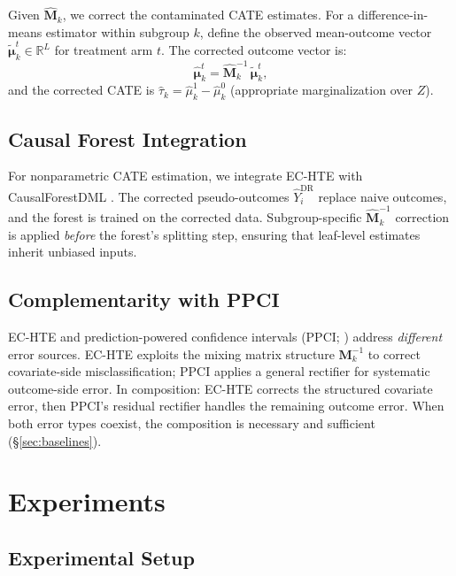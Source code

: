 \documentclass[11pt,twocolumn]{article}
\theoremstyle{remark}
\newcommand{\R}{\mathbb{R}}
\newcommand{\vect}[1]{\boldsymbol{#1}}
\begin{document}
Given $\hat{\vect{M}}_k$, we correct the contaminated CATE estimates.
For a difference-in-means estimator within subgroup $k$, define the observed mean-outcome vector $\tilde{\vect{\mu}}_k^t \in \R^L$ for treatment arm $t$.
The corrected outcome vector is:
\begin{equation}
\hat{\vect{\mu}}_k^t = \hat{\vect{M}}_k^{-1} \, \tilde{\vect{\mu}}_k^t,
\end{equation}
and the corrected CATE is $\hat{\tau}_k = \hat{\mu}_k^1 - \hat{\mu}_k^0$ (appropriate marginalization over $Z$).

\subsection{Causal Forest Integration}

For nonparametric CATE estimation, we integrate EC-HTE with CausalForestDML \cite{athey2019generalized, chernozhukov2018double}.
The corrected pseudo-outcomes $\hat{Y}_i^{\mathrm{DR}}$ replace naive outcomes, and the forest is trained on the corrected data.
Subgroup-specific $\hat{\vect{M}}_k^{-1}$ correction is applied \emph{before} the forest's splitting step, ensuring that leaf-level estimates inherit unbiased inputs.

\subsection{Complementarity with PPCI}\label{sec:ppci}

EC-HTE and prediction-powered confidence intervals (PPCI; \cite{sui2026ppci}) address \emph{different} error sources.
EC-HTE exploits the mixing matrix structure $\vect{M}_k^{-1}$ to correct covariate-side misclassification; PPCI applies a general rectifier for systematic outcome-side error.
In composition: EC-HTE corrects the structured covariate error, then PPCI's residual rectifier handles the remaining outcome error.
When both error types coexist, the composition is necessary and sufficient (\S\ref{sec:baselines}).

\section{Experiments}\label{sec:experiments}

\subsection{Experimental Setup}
\end{document}
